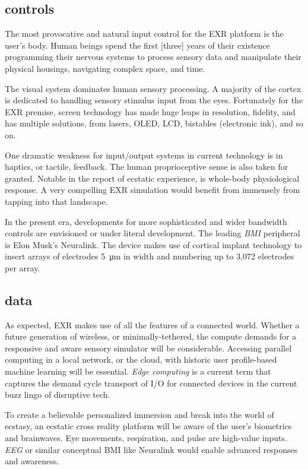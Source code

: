 \documentclass{UIdahoMastersThesis}
\begin{document}
\subsection{controls}

The most provocative and natural input control for the EXR platform is the user's body. Human beings spend the first [three] years of their existence programming their nervous systems to process sensory data and manipulate their physical housings, navigating complex space, and time. 

The visual system dominates human sensory processing. A majority of the cortex is dedicated to handling sensory stimulus input from the eyes. Fortunately for the EXR premise, screen technology has made huge leaps in resolution, fidelity, and has multiple solutions, from lasers, OLED, LCD, bistables (electronic ink), and so on.

One dramatic weakness for input/output systems in current technology is in haptics, or tactile, feedback. The human proprioceptive sense is also taken for granted. Notable in the report of ecstatic experience, is whole-body physiological response. A very compelling EXR simulation would benefit from immensely from tapping into that landscape. 

In the present era, developments for more sophisticated and wider bandwidth controls are envisioned or under literal development. The leading \textit{\ac{BMI}} peripheral is Elon Musk's Neuralink. The device makes use of cortical implant technology to insert arrays of electrodes \SI{5}{\micro\meter} in width and numbering up to 3,072 electrodes per array. 


\subsection{data}

As expected, EXR makes use of all the features of a connected world. Whether a future generation of wireless, or minimally-tethered, the compute demands for a responsive and aware sensory simulator will be considerable. Accessing parallel computing in a local network, or the cloud, with historic user profile-based machine learning will be essential. \emph{Edge computing }is a current term that captures the demand cycle transport of I/O for connected devices in the current buzz lingo of disruptive tech.

To create a believable personalized immersion and break into the world of ecstasy, an ecstatic cross reality platform will be aware of the user's biometrics and brainwaves. Eye movements, respiration, and pulse are high-value inputs. \textit{\ac{EEG}} or similar conceptual \ac{BMI} like Neuralink would enable advanced responses and awareness.
\end{document}
